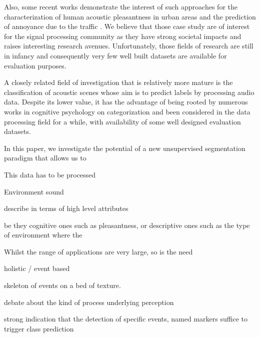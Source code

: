 \documentclass[journal]{IEEEtran}
\begin{document}
Also, some recent works demonstrate the interest of such approaches for the characterization of human acoustic pleasantness in urban areas \cite{lafay, lavandier} and the prediction of annoyance due to the traffic \cite{gloaguen}. We believe that those case study are of interest for the signal processing community as they have strong societal impacts and raises interesting research avenues. Unfortunately, those fields of research are still in infancy and consequently very few well built datasets are available for evaluation purposes. 

A closely related field of investigation that is relatively more mature is the classification of acoustic scenes whose aim is to predict labels by processing audio data. Despite its lower value, it has the advantage of being rooted by numerous works in cognitive psychology on categorization \cite{dubois} and been considered in the data processing field for a while, with availability of some well designed evaluation datasets. 

In this paper, we investigate the potential of a new unsupervised segmentation paradigm that allows us to 

This data has to be processed


Environment sound

describe in terms of high level attributes

be they cognitive ones such as pleasantness, or descriptive ones such as the type of environment where the 



Whilst the range of applications are very large, so is the need

holistic / event based

skeleton of events on a bed of texture.

debate about the kind of process underlying perception

strong indication that the detection of specific events, named markers suffice to trigger class prediction
\end{document}
